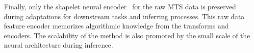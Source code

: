\documentclass{article}
\begin{document}
Finally, only the shapelet neural encoder~\cite{liang2023contrastive} for the raw MTS data is preserved during adaptations for downstream tasks and inferring processes. This raw data feature encoder memorizes algorithmic knowledge from the transforms and encoders. The scalability of the method is also promoted by the small scale of the neural architecture during inference. 









\end{document}
